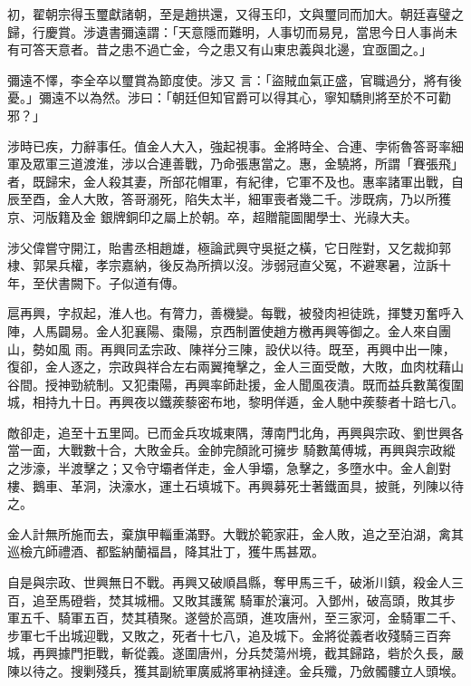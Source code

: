 \begin{pinyinscope}
 初，翟朝宗得玉璽獻諸朝，至是趙拱還，又得玉印，文與璽同而加大。朝廷喜璧之歸，行慶賞。涉遺書彌遠謂：「天意隱而難明，人事切而易見，當思今日人事尚未有可答天意者。昔之患不過亡金，今之患又有山東忠義與北邊，宜亟圖之。」



 彌遠不懌，李全卒以璽賞為節度使。涉又
 言：「盜賊血氣正盛，官職過分，將有後憂。」彌遠不以為然。涉曰：「朝廷但知官爵可以得其心，寧知驕則將至於不可勸邪？」



 涉時已疾，力辭事任。值金人大入，強起視事。金將時全、合連、孛術魯答哥率細軍及眾軍三道渡淮，涉以合連善戰，乃命張惠當之。惠，金驍將，所謂「賽張飛」者，既歸宋，金人殺其妻，所部花帽軍，有紀律，它軍不及也。惠率諸軍出戰，自辰至酉，金人大敗，答哥溺死，陷失太半，細軍喪者幾二千。涉既病，乃以所獲京、河版籍及金
 銀牌銅印之屬上於朝。卒，超贈龍圖閣學士、光祿大夫。



 涉父偉嘗守開江，貽書丞相趙雄，極論武興守吳挺之橫，它日陛對，又乞裁抑郭棣、郭杲兵權，孝宗嘉納，後反為所擠以沒。涉弱冠直父冤，不避寒暑，泣訴十年，至伏書闕下。子似道有傳。



 扈再興，字叔起，淮人也。有膂力，善機變。每戰，被發肉袒徒跣，揮雙刃奮呼入陣，人馬闢易。金人犯襄陽、棗陽，京西制置使趙方檄再興等御之。金人來自團山，勢如風
 雨。再興同孟宗政、陳祥分三陳，設伏以待。既至，再興中出一陳，復卻，金人逐之，宗政與祥合左右兩翼掩擊之，金人三面受敵，大敗，血肉枕藉山谷間。授神勁統制。又犯棗陽，再興率師赴援，金人聞風夜潰。既而益兵數萬復圍城，相持九十日。再興夜以鐵蒺藜密布地，黎明佯遁，金人馳中蒺藜者十踣七八。



 敵卻走，追至十五里岡。已而金兵攻城東隅，薄南門北角，再興與宗政、劉世興各當一面，大戰數十合，大敗金兵。金帥完顏訛可擁步
 騎數萬傅城，再興與宗政縱之涉濠，半渡擊之；又令守壩者佯走，金人爭壩，急擊之，多墮水中。金人創對樓、鵝車、革洞，決濠水，運土石填城下。再興募死士著鐵面具，披氈，列陳以待之。



 金人計無所施而去，棄旗甲輜重滿野。大戰於範家莊，金人敗，追之至泊湖，禽其巡檢亢師禮酒、都監納蘭福昌，降其壯丁，獲牛馬甚眾。



 自是與宗政、世興無日不戰。再興又破順昌縣，奪甲馬三千，破淅川鎮，殺金人三百，追至馬磴砦，焚其城柵。又敗其護駕
 騎軍於瀼河。入鄧州，破高頭，敗其步軍五千、騎軍五百，焚其積聚。遂營於高頭，進攻唐州，至三家河，金騎軍二千、步軍七千出城迎戰，又敗之，死者十七八，追及城下。金將從義者收殘騎三百奔城，再興據門拒戰，斬從義。遂圍唐州，分兵焚蕩州境，截其歸路，砦於久長，嚴陳以待之。搜剿殘兵，獲其副統軍廣威將軍衲撻達。金兵殲，乃斂髑髏立人頭堠。




\end{pinyinscope}
